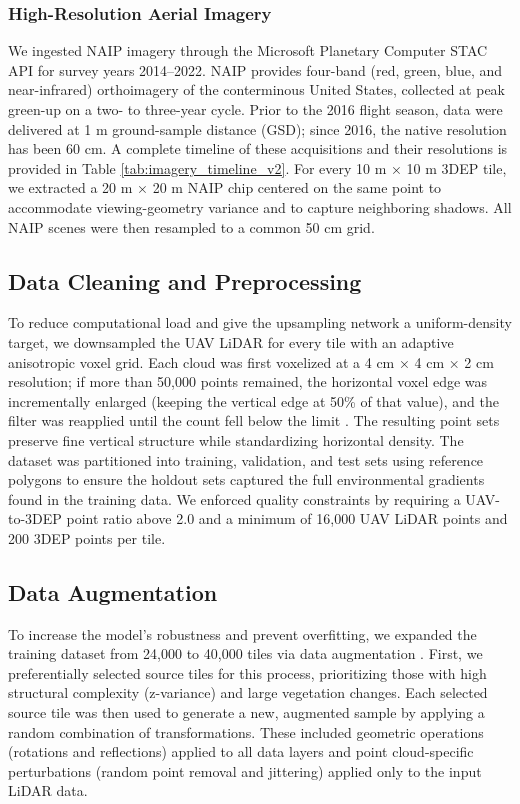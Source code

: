 \documentclass[remotesensing,article,accept,pdftex,moreauthors]{Definitions/mdpi}
\begin{document}
\subsubsection{High-Resolution Aerial Imagery}
We ingested NAIP imagery through the Microsoft Planetary Computer STAC API \citep{planetary_computer} for survey years 2014–2022. NAIP provides four-band (red, green, blue, and near-infrared) orthoimagery of the conterminous United States, collected at peak green-up on a two- to three-year cycle. Prior to the 2016 flight season, data were delivered at 1 m ground-sample distance (GSD); since 2016, the native resolution has been 60 cm. A complete timeline of these acquisitions and their resolutions is provided in Table \ref{tab:imagery_timeline_v2}. For every 10 m × 10 m 3DEP tile, we extracted a 20 m × 20 m NAIP chip centered on the same point to accommodate viewing-geometry variance and to capture neighboring shadows. All NAIP scenes were then resampled to a common 50 cm grid.



\subsection{Data Cleaning and Preprocessing}
To reduce computational load and give the upsampling network a uniform-density target, we downsampled the UAV LiDAR for every tile with an adaptive anisotropic voxel grid. Each cloud was first voxelized at a 4 cm × 4 cm × 2 cm resolution; if more than 50,000 points remained, the horizontal voxel edge was incrementally enlarged (keeping the vertical edge at 50\% of that value), and the filter was reapplied until the count fell below the limit%
. The resulting point sets preserve fine vertical structure while standardizing horizontal density. The dataset was partitioned into training, validation, and test sets using reference polygons to ensure the holdout sets captured the full environmental gradients found in the training data. We enforced quality constraints by requiring a UAV-to-3DEP point ratio above 2.0 and a minimum of 16,000 UAV LiDAR points and 200 3DEP points per tile.


\subsection{Data Augmentation}
To increase the model's robustness and prevent overfitting, we expanded the training dataset from 24,000 to 40,000 tiles via data augmentation \cite{zhu2024advancements, shorten2019survey}. First, we preferentially selected source tiles for this process, prioritizing those with high structural complexity (z-variance) and large vegetation changes. Each selected source tile was then used to generate a new, augmented sample by applying a random combination of transformations. These included geometric operations (rotations and reflections) applied to all data layers and point cloud-specific perturbations (random point removal and jittering) applied only to the input LiDAR data.
\end{document}
